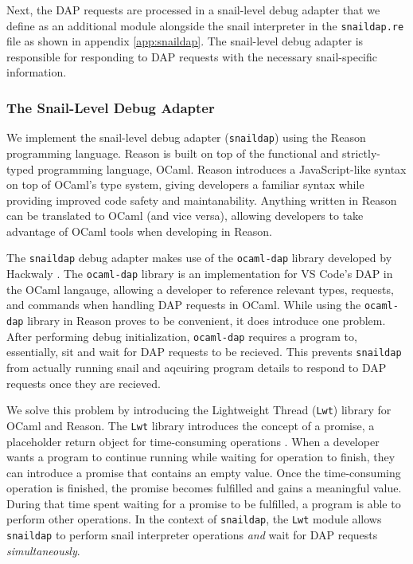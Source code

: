 \documentclass{article}
\begin{document}
Next, the DAP requests are processed in a snail-level debug adapter that we define as an additional module alongside the snail interpreter in the \lstinline{snaildap.re} file as shown in appendix \ref{app:snaildap}. The snail-level debug adapter is responsible for responding to DAP requests with the necessary snail-specific information. 

\subsubsection{The Snail-Level Debug Adapter}

We implement the snail-level debug adapter (\lstinline{snaildap}) using the Reason programming language. Reason is built on top of the functional and strictly-typed programming language, OCaml\cite{Reason_2020}. Reason introduces a JavaScript-like syntax on top of OCaml's type system, giving developers a familiar syntax while providing improved code safety and maintanability. Anything written in Reason can be translated to OCaml (and vice versa), allowing developers to take advantage of OCaml tools when developing in Reason.

The \lstinline{snaildap} debug adapter makes use of the \lstinline{ocaml-dap} library developed by Hackwaly \cite{Hackwaly_2021}. The \lstinline{ocaml-dap} library is an implementation for VS Code's DAP in the OCaml langauge, allowing a developer to reference relevant types, requests, and commands when handling DAP requests in OCaml. While using the \lstinline{ocaml-dap} library in Reason proves to be convenient, it does introduce one problem. After performing debug initialization, \lstinline{ocaml-dap} requires a program to, essentially, sit and wait for DAP requests to be recieved. This prevents \lstinline{snaildap} from actually running snail and aqcuiring program details to respond to DAP requests once they are recieved. 

We solve this problem by introducing the Lightweight Thread (\lstinline{Lwt}) library for OCaml and Reason. The \lstinline{Lwt} library introduces the concept of a promise, a placeholder return object for time-consuming operations \cite{Ocsigen_2023}. When a developer wants a program to continue running while waiting for operation to finish, they can introduce a promise that contains an empty value. Once the time-consuming operation is finished, the promise becomes fulfilled and gains a meaningful value. During that time spent waiting for a promise to be fulfilled, a program is able to perform other operations. In the context of \lstinline{snaildap}, the \lstinline{Lwt} module allows \lstinline{snaildap} to perform snail interpreter operations \emph{and} wait for DAP requests \emph{simultaneously}.
\end{document}
